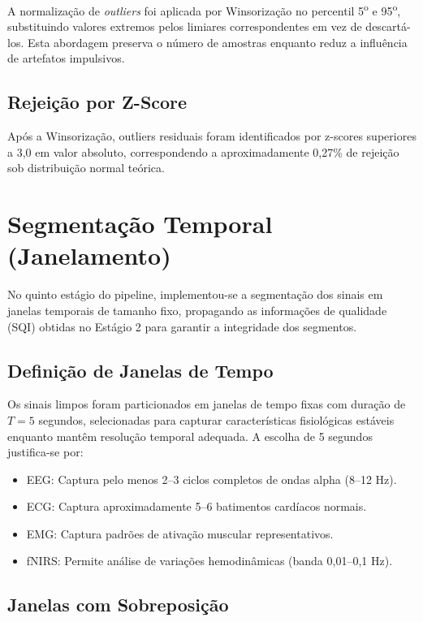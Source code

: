 A normalização de \textit{outliers} foi aplicada por Winsorização no percentil 5\textsuperscript{o} e 95\textsuperscript{o}, substituindo valores extremos pelos limiares correspondentes em vez de descartá-los. Esta abordagem preserva o número de amostras enquanto reduz a influência de artefatos impulsivos.

\subsection{Rejeição por Z-Score}

Após a Winsorização, outliers residuais foram identificados por z-scores superiores a 3,0 em valor absoluto, correspondendo a aproximadamente 0,27\% de rejeição sob distribuição normal teórica.

\section{Segmentação Temporal (Janelamento)}
\label{sec:metodo_segmentacao}

No quinto estágio do pipeline, implementou-se a segmentação dos sinais em janelas temporais de tamanho fixo, propagando as informações de qualidade (SQI) obtidas no Estágio 2 para garantir a integridade dos segmentos.

\subsection{Definição de Janelas de Tempo}

Os sinais limpos foram particionados em janelas de tempo fixas com duração de $T = 5$ segundos, selecionadas para capturar características fisiológicas estáveis enquanto mantêm resolução temporal adequada. A escolha de 5 segundos justifica-se por:
\begin{itemize}
    \item EEG: Captura pelo menos 2--3 ciclos completos de ondas alpha (8--12 Hz).
    \item ECG: Captura aproximadamente 5--6 batimentos cardíacos normais.
    \item EMG: Captura padrões de ativação muscular representativos.
    \item fNIRS: Permite análise de variações hemodinâmicas (banda 0,01--0,1 Hz).
\end{itemize}

\subsection{Janelas com Sobreposição}

